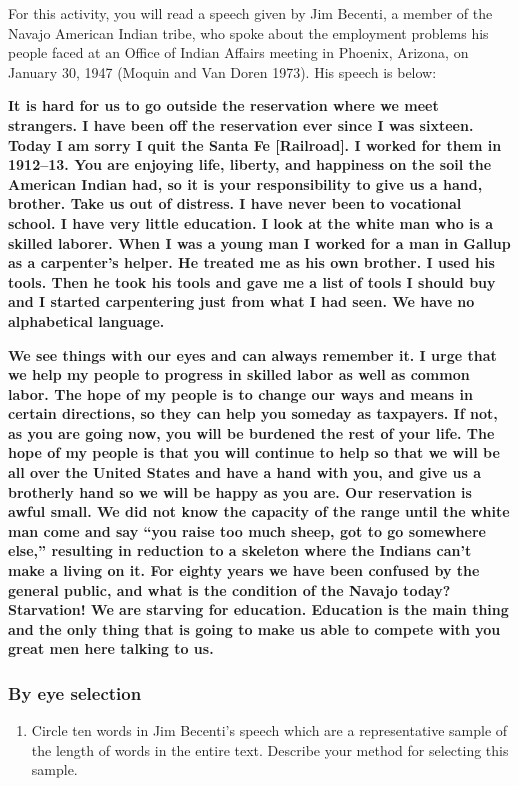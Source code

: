 \documentclass[
]{report}
\providecommand{\tightlist}{%
  \setlength{\itemsep}{0pt}\setlength{\parskip}{0pt}}
\begin{document}
For this activity, you will read a speech given by Jim Becenti, a member of the Navajo American Indian tribe, who spoke about the employment problems his people faced at an Office of Indian Affairs meeting in Phoenix, Arizona, on January 30, 1947 (Moquin and Van Doren 1973). His speech is below:

\textbf{It is hard for us to go outside the reservation where we meet strangers. I have been off the reservation ever since I was sixteen. Today I am sorry I quit the Santa Fe {[}Railroad{]}. I worked for them in 1912--13. You are enjoying life, liberty, and happiness on the soil the American Indian had, so it is your responsibility to give us a hand, brother. Take us out of distress. I have never been to vocational school. I have very little education. I look at the white man who is a skilled laborer. When I was a young man I worked for a man in Gallup as a carpenter's helper. He treated me as his own brother. I used his tools. Then he took his tools and gave me a list of tools I should buy and I started carpentering just from what I had seen. We have no alphabetical language.}

\textbf{We see things with our eyes and can always remember it. I urge that we help my people to progress in skilled labor as well as common labor. The hope of my people is to change our ways and means in certain directions, so they can help you someday as taxpayers. If not, as you are going now, you will be burdened the rest of your life. The hope of my people is that you will continue to help so that we will be all over the United States and have a hand with you, and give us a brotherly hand so we will be happy as you are. Our reservation is awful small. We did not know the capacity of the range until the white man come and say ``you raise too much sheep, got to go somewhere else,'' resulting in reduction to a skeleton where the Indians can't make a living on it. For eighty years we have been confused by the general public, and what is the condition of the Navajo today? Starvation! We are starving for education. Education is the main thing and the only thing that is going to make us able to compete with you great men here talking to us.}

\subsubsection*{By eye selection}\label{by-eye-selection}

\begin{enumerate}
\def\labelenumi{\arabic{enumi}.}
\tightlist
\item
  Circle ten words in Jim Becenti's speech which are a representative sample of the length of words in the entire text. Describe your method for selecting this sample.
\end{enumerate}
\end{document}
